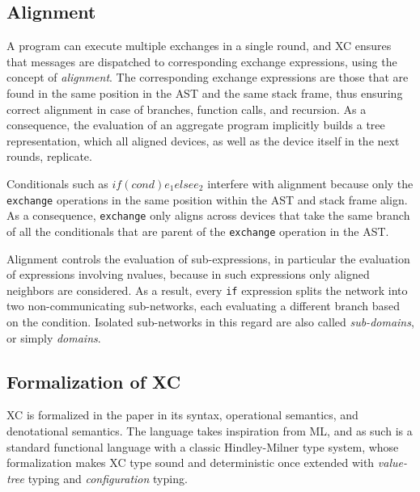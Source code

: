 

\subsection{Alignment}\label{chap:background->sec:xc->subsec:alignment}

A program can execute multiple exchanges in a single round, and \ac{XC} ensures that messages are dispatched to corresponding exchange expressions, using the concept of \textit{alignment}.
%
The corresponding exchange expressions are those that are found in the same position in the \ac{AST} and the same stack frame, thus ensuring correct alignment in case of branches, function calls, and recursion\cite{xc}.
%
As a consequence, the evaluation of an aggregate program implicitly builds a tree representation, which all aligned devices, as well as the device itself in the next rounds, replicate.

Conditionals such as $if (cond) {e_1} else {e_2}$ interfere with alignment because only the \texttt{exchange} operations in the same position within the AST and stack frame align\cite{xc}.
%
As a consequence, \texttt{exchange} only aligns across devices that take the same branch of all the conditionals that are parent of the \texttt{exchange} operation in the AST.

Alignment controls the evaluation of sub-expressions, in particular the evaluation of expressions involving nvalues, because in such expressions only aligned neighbors are considered.
%
As a result, every \texttt{if} expression splits the network into two non-communicating sub-networks, each evaluating a different branch based on the condition\cite{xc}.
%
Isolated sub-networks in this regard are also called \textit{sub-domains}, or simply \textit{domains}.

\subsection{Formalization of XC}

\ac{XC} is formalized in the paper\cite{xc} in its syntax, operational semantics, and denotational semantics.
%
The language takes inspiration from \ac{ML}, and as such is a standard functional language with a classic Hindley-Milner type system, whose formalization makes \ac{XC} type sound and deterministic once extended with \textit{value-tree} typing and \textit{configuration} typing\cite{xc}.

